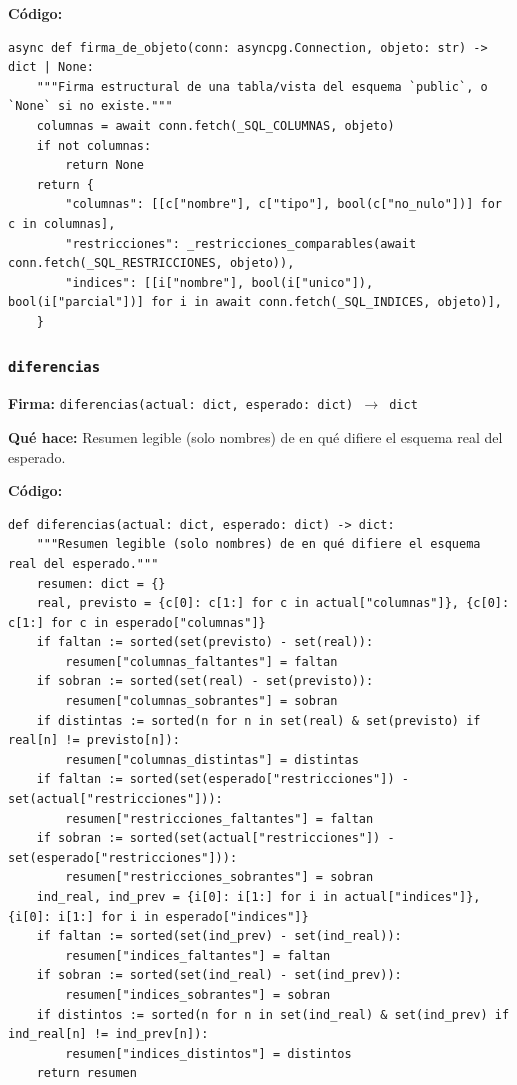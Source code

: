 \documentclass[11pt,a4paper]{article}
\begin{document}
\textbf{Código:}
\begin{lstlisting}
async def firma_de_objeto(conn: asyncpg.Connection, objeto: str) -> dict | None:
    """Firma estructural de una tabla/vista del esquema `public`, o `None` si no existe."""
    columnas = await conn.fetch(_SQL_COLUMNAS, objeto)
    if not columnas:
        return None
    return {
        "columnas": [[c["nombre"], c["tipo"], bool(c["no_nulo"])] for c in columnas],
        "restricciones": _restricciones_comparables(await conn.fetch(_SQL_RESTRICCIONES, objeto)),
        "indices": [[i["nombre"], bool(i["unico"]), bool(i["parcial"])] for i in await conn.fetch(_SQL_INDICES, objeto)],
    }
\end{lstlisting}

\subsubsection*{\texttt{diferencias}}
\textbf{Firma:} \texttt{diferencias(actual: dict, esperado: dict) $\rightarrow$ dict}

\textbf{Qué hace:} Resumen legible (solo nombres) de en qué difiere el esquema real del esperado.

\textbf{Código:}
\begin{lstlisting}
def diferencias(actual: dict, esperado: dict) -> dict:
    """Resumen legible (solo nombres) de en qué difiere el esquema real del esperado."""
    resumen: dict = {}
    real, previsto = {c[0]: c[1:] for c in actual["columnas"]}, {c[0]: c[1:] for c in esperado["columnas"]}
    if faltan := sorted(set(previsto) - set(real)):
        resumen["columnas_faltantes"] = faltan
    if sobran := sorted(set(real) - set(previsto)):
        resumen["columnas_sobrantes"] = sobran
    if distintas := sorted(n for n in set(real) & set(previsto) if real[n] != previsto[n]):
        resumen["columnas_distintas"] = distintas
    if faltan := sorted(set(esperado["restricciones"]) - set(actual["restricciones"])):
        resumen["restricciones_faltantes"] = faltan
    if sobran := sorted(set(actual["restricciones"]) - set(esperado["restricciones"])):
        resumen["restricciones_sobrantes"] = sobran
    ind_real, ind_prev = {i[0]: i[1:] for i in actual["indices"]}, {i[0]: i[1:] for i in esperado["indices"]}
    if faltan := sorted(set(ind_prev) - set(ind_real)):
        resumen["indices_faltantes"] = faltan
    if sobran := sorted(set(ind_real) - set(ind_prev)):
        resumen["indices_sobrantes"] = sobran
    if distintos := sorted(n for n in set(ind_real) & set(ind_prev) if ind_real[n] != ind_prev[n]):
        resumen["indices_distintos"] = distintos
    return resumen
\end{lstlisting}
\end{document}
